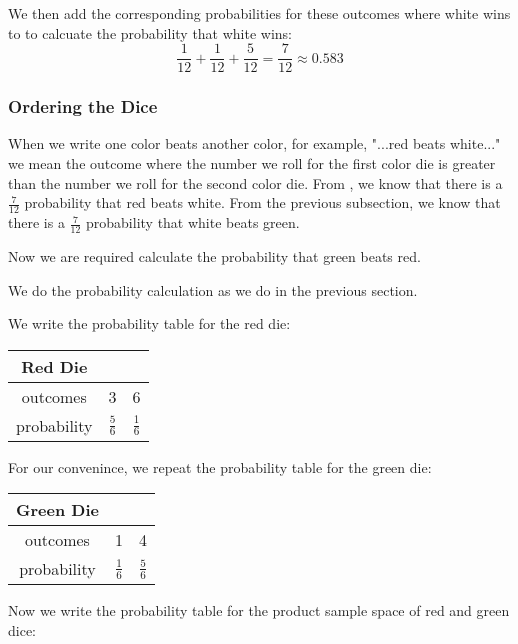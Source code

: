 \documentclass[a4paper,11pt]{article}
\begin{document}
We then add the corresponding probabilities for these outcomes where
white wins to to calcuate the probability that white wins:
\begin{equation}
\frac{1}{12} + \frac{1}{12} + \frac{5}{12} = \frac{7}{12} \approx 0.583
\end{equation}

\subsubsection{Ordering the Dice}
When we write one color beats another color, for example, "...red
beats white..." we mean the outcome where the number we roll for the
first color die is greater than the number we roll for the second
color die.
From \cite{classSlides2}, we know that there is a $\frac{7}{12}$
probability that red beats white.
From the previous subsection, we know that there is a $\frac{7}{12}$
probability that white beats green.

Now we are required calculate the probability that green beats red.

We do the probability calculation as we do in the previous section.

We write the probability table for the red die:

\begin{center}
  \begin{tabular}{ | c | c | c |}
    \hline
    Red Die & & \\ \hline
    outcomes & 3 & 6 \\ \hline
    probability & $\frac{5}{6}$ & $\frac{1}{6}$  \\ \hline
  \end{tabular}
\end{center}

For our convenince, we repeat the probability table for the green
die:

\begin{center}
  \begin{tabular}{ | c | c | c |}
    \hline
    Green Die & & \\ \hline
    outcomes & 1 & 4 \\ \hline
    probability & $\frac{1}{6}$ & $\frac{5}{6}$  \\ \hline
  \end{tabular}
\end{center}

Now we write the probability table for the product sample space of 
red and green dice:
\end{document}
